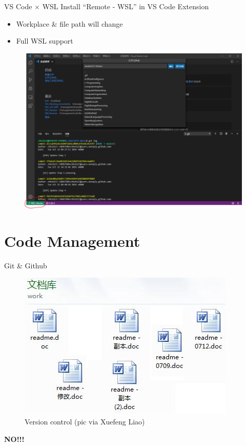 \documentclass{../TexTemplate/myslide}
\begin{document}
\begin{frame}{VS Code $\times$ WSL}
Install ``Remote - WSL'' in VS Code Extension
\begin{itemize}
	\item Workplace \& file path will change
	\item Full WSL support
\end{itemize}
\begin{figure}
\centering
\includegraphics[width=0.6\linewidth]{fig/vscode_wsl.png}
\end{figure}
\end{frame}

\section{Code Management}
\begin{frame}
\sectionpage
\end{frame}

\begin{frame}{Git \& Github}
\begin{figure}
\centering
\includegraphics[width=0.5\linewidth]{fig/word-copy.jpg}
\caption*{Version control (pic via Xuefeng Liao)}
\end{figure}
\pause
\begin{center}
\Large \textbf{NO!!!}
\end{center}
\end{frame}
\end{document}
